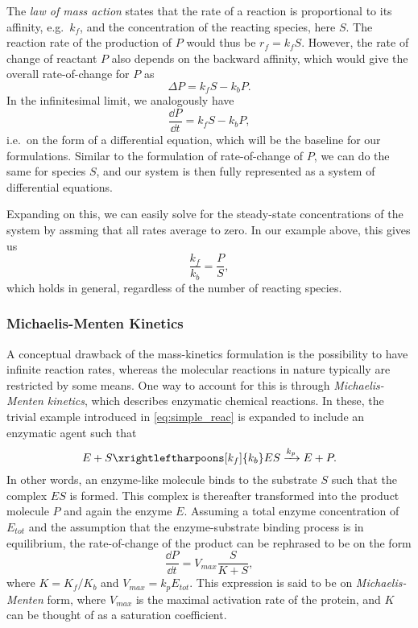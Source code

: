 The \textit{law of mass action} states that the rate of a reaction
is proportional to its affinity, e.g.\ $k_f$, and the concentration of the
reacting species, here $S$. The reaction rate of the production of $P$ would thus be
$r_f = k_f S$. However, the rate of change of reactant $P$ also depends
on the backward affinity, which would give the overall rate-of-change for $P$ as
\begin{equation}
  \Delta P = k_f S - k_b P.
  \label{eq:mass_action_noninf}
\end{equation}
In the infinitesimal limit, we analogously have 
\begin{equation}
  \frac{\dd P}{\dd t} = k_f S - k_b P,
  \label{eq:mass_action_inf}
\end{equation}
i.e.\ on the form of a differential equation, which will be the baseline for our
formulations. Similar to the formulation of rate-of-change of $P$, we can do the
same for species $S$, and our system is then fully represented as a system of
differential equations.

Expanding on this, we can easily solve for the steady-state concentrations of
the system by assming that all rates average to zero. In our example above, this
gives us 
\begin{equation}
  \frac{k_f}{k_b} = \frac{P}{S},
  \label{eq:mass_action_ss}
\end{equation}
which holds in general, regardless of the number of reacting species.

\subsubsection[Michaelis-Menten Kinetics]{Michaelis-Menten Kinetics}
A conceptual drawback of the mass-kinetics formulation is the possibility to
have infinite reaction rates, whereas the molecular reactions in nature typically
are restricted by some means. One way to account for this is through
\textit{Michaelis-Menten kinetics}, which describes enzymatic chemical
reactions. In these, the trivial example introduced in \cref{eq:simple_reac} is
expanded to include an enzymatic agent such that
\begin{equation}
  E + S \xrightleftharpoons[k_f]{k_b} ES \xrightarrow{k_p} E + P.
  \label{eq:enzymatic_react}
\end{equation}
In other words, an enzyme-like molecule binds to the substrate $S$ such that the
complex $ES$ is formed. This complex is thereafter transformed into the product
molecule $P$ and again the enzyme $E$. Assuming a total enzyme concentration of
$E_{tot}$ and the assumption that the enzyme-substrate binding process is in
equilibrium, the rate-of-change of the product can be rephrased to be on the
form 
\begin{equation}
  \frac{\dd P}{\dd t} = V_{max} \frac{S}{K + S},
  \label{eq:michaelis-menten}
\end{equation}
where $K = K_f / K_b$ and $V_{max} = k_pE_{tot}$. This expression is said to be
on \textit{Michaelis-Menten} form, where $V_{max}$ is the maximal
activation rate of the protein, and $K$ can be thought of as a saturation
coefficient.

